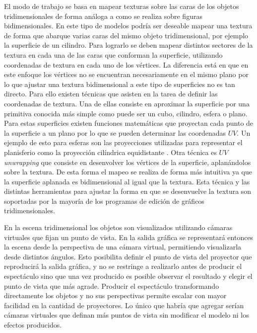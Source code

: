 El modo de trabajo se basa en mapear texturas sobre las caras de los objetos tridimensionales de forma análoga a como se realiza sobre figuras bidimensionales. En este tipo de modelos podría ser deseable mapear una textura de forma que abarque varias caras del mismo objeto tridimensional, por ejemplo la superficie de un cilindro. Para lograrlo se deben mapear distintos sectores de la textura en cada una de las caras que conforman la superficie, utilizando coordenadas de textura en cada uno de los vértices. La diferencia está en que en este enfoque los vértices no se encuentran necesariamente en el mismo plano por lo que ajustar una textura bidimensional a este tipo de superficies no es tan directo. Para ello existen técnicas que asisten en la tarea de definir las coordenadas de textura. Una de ellas consiste en aproximar la superficie por una primitiva conocida más simple como puede ser un cubo, cilindro, esfera o plano. Para estas superficies existen funciones matemáticas que proyectan cada punto de la superficie a un plano por lo que se pueden determinar las coordenadas $UV$. Un ejemplo de esto para esferas son las proyecciones utilizadas para representar el planisferio como la proyección cilíndrica equidistante \cite{flatteningTheEarth}. Otra técnica es $UV$ \emph{unwrapping} que consiste en desenvolver los vértices de la superficie, aplanándolos sobre la textura. De esta forma el mapeo se realiza de forma más intuitiva ya que la superficie aplanada es bidimensional al igual que la textura. Esta técnica y las distintas herramientas para ajustar la forma en que se desenvuelve la textura son soportadas por la mayoría de los programas de edición de gráficos tridimensionales.

En la escena tridimensional los objetos son visualizados utilizando cámaras virtuales que fijan un punto de vista. En la salida gráfica se representará entonces la escena desde la perspectiva de una cámara virtual, permitiendo visualizarla desde distintos ángulos. Esto posibilita definir el punto de vista del proyector que reproducirá la salida gráfica, y no se restringe a realizarlo antes de producir el espectáculo sino que una vez producido es posible observar el resultado y elegir el punto de vista que más agrade.
Producir el espectáculo transformando directamente los objetos y no sus perspectivas permite escalar con mayor facilidad en la cantidad de proyectores. Lo único que habría que agregar serían cámaras virtuales que definan más puntos de vista sin modificar el modelo ni los efectos producidos.

